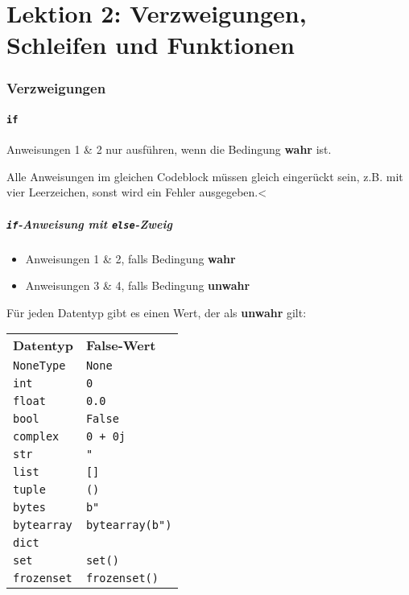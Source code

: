 \part{Lektion 2: Verzweigungen, Schleifen und Funktionen}
\section{Verzweigungen}
\subsection{\texttt{if}}

Anweisungen 1 \& 2 nur ausführen, wenn die Bedingung \textbf{wahr} ist.\\
\begin{achtung}
	Alle Anweisungen im gleichen Codeblock müssen gleich eingerückt sein, z.B. mit vier Leerzeichen, sonst wird ein Fehler ausgegeben.<
\end{achtung}

\subsubsection{\texttt{if}-Anweisung mit \texttt{else}-Zweig}

\begin{itemize}
	\item Anweisungen 1 \& 2, falls Bedingung \textbf{wahr}
	\item Anweisungen 3 \& 4, falls Bedingung \textbf{unwahr}
\end{itemize}
Für jeden Datentyp gibt es einen Wert, der als \textbf{unwahr} gilt:\\
\begin{tabular}{|l|l|}
	\hline 
	\textbf{Datentyp} &\textbf{False-Wert}\\  
	\texttt{NoneType} &\texttt{None}\\ 
	\texttt{int} &\texttt{0}\\  
	\texttt{float} &\texttt{0.0}\\ 
	\texttt{bool} &\texttt{False}\\  
	\texttt{complex} &\texttt{0 + 0j}\\ 
	\texttt{str} &\texttt{"}\\  
	\texttt{list} &\texttt{[]}\\ 
	\texttt{tuple} &\texttt{()}\\ 
	\texttt{bytes} &\texttt{b"}\\ 
	\texttt{bytearray} &\texttt{bytearray(b")}\\ 
	\texttt{dict} &\texttt{{}}\\ 
	\texttt{set} &\texttt{set()}\\ 
	\texttt{frozenset} &\texttt{frozenset()}\\ 
	\hline 
\end{tabular}

